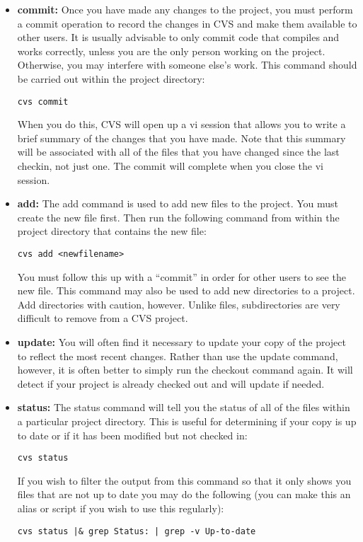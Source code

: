 \documentclass[11pt, letterpaper]{article}
\begin{document}
\begin{itemize}
	\item \textbf{commit:} Once you have made any changes to the project,
	you must perform a commit operation to record the changes in CVS and make
	them available to other users.  It is usually advisable to only
	commit code that compiles and works correctly, unless you are the
	only person working on the project.  Otherwise, you may interfere
	with someone else's work.  This command should be carried out within
	the project directory:

\begin{verbatim}
cvs commit
\end{verbatim}

	When you do this, CVS will open up a vi session that allows you to
	write a brief summary of the changes that you have made.  Note that
	this summary will be associated with all of the files that you have
	changed since the last checkin, not just one.  The commit will
	complete when you close the vi session.

	\item \textbf{add:} The add command is used to add new files to the
	project.  You must create the new file first.  Then run the following
	command from within the project directory that contains the new file:

\begin{verbatim}
cvs add <newfilename>
\end{verbatim}

	You must follow this up with a ``commit'' in order for other users to
	see the new file.  This command may also be used to add new
	directories to a project.  Add directories with caution, however.
	Unlike files, subdirectories are very difficult to remove from a CVS
	project.

	\item \textbf{update:} You will often find it necessary to 
	update your copy of the project
	to reflect the most recent changes.  Rather than use the update
	command, however, it is
	often better to simply run the checkout command again.  It will
	detect if your project is already checked out and will update if
	needed.  

	\item \textbf{status:} The status command will tell you the status of
	all of the files within a particular project directory.  This is useful for 
	determining if your copy is up to date or if it has been modified but
	not checked in:

\begin{verbatim}
cvs status
\end{verbatim}

	If you wish to filter the output from this command so that it only
	shows you files that are not up to date you may do the following
	(you can make this an alias or script if you wish to use this
	regularly):

\begin{verbatim}
cvs status |& grep Status: | grep -v Up-to-date 
\end{verbatim}

\end{itemize}
\end{document}

